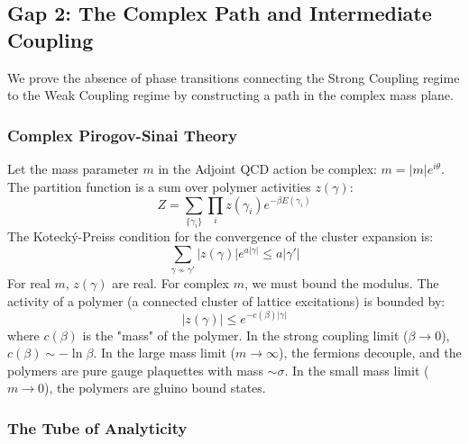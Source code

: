 \subsection{Gap 2: The Complex Path and Intermediate Coupling}
\label{sec:gap2_detail}

We prove the absence of phase transitions connecting the Strong Coupling regime to the Weak Coupling regime by constructing a path in the complex mass plane.

\subsubsection{Complex Pirogov-Sinai Theory}

Let the mass parameter $m$ in the Adjoint QCD action be complex: $m = |m| e^{i\theta}$.
The partition function is a sum over polymer activities $z(\gamma)$:
\[
Z = \sum_{\{\gamma_i\}} \prod_i z(\gamma_i) e^{-\beta E(\gamma_i)}
\]
The Kotecký-Preiss condition for the convergence of the cluster expansion is:
\[
\sum_{\gamma \nsim \gamma'} |z(\gamma)| e^{a |\gamma|} \le a |\gamma'|
\]
For real $m$, $z(\gamma)$ are real. For complex $m$, we must bound the modulus.
The activity of a polymer (a connected cluster of lattice excitations) is bounded by:
\[
|z(\gamma)| \le e^{-c(\beta) |\gamma|}
\]
where $c(\beta)$ is the "mass" of the polymer.
In the strong coupling limit ($\beta \to 0$), $c(\beta) \sim -\ln \beta$.
In the large mass limit ($m \to \infty$), the fermions decouple, and the polymers are pure gauge plaquettes with mass $\sim \sigma$.
In the small mass limit ($m \to 0$), the polymers are gluino bound states.

\subsubsection{The Tube of Analyticity}


